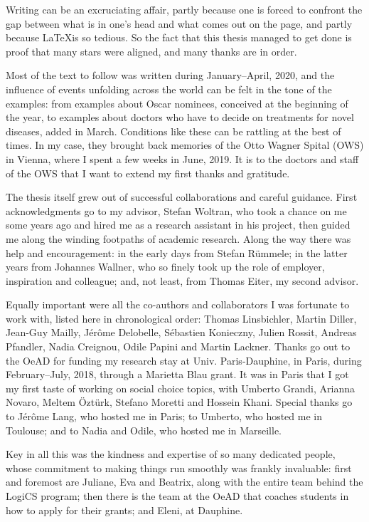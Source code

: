 Writing can be an excruciating affair, 
partly because one is forced to confront the 
gap between what is in one's head and what comes out on the page,
and partly because \LaTeX is so tedious.
So the fact that this thesis managed to get done is proof 
that many stars were aligned, and many thanks are in order.

Most of the text to follow was written during January--April, 2020,
and the influence of events unfolding across the world 
can be felt in the tone of the examples: 
from examples about Oscar nominees, conceived at the beginning of the year,
to examples about doctors who have to decide on treatments for novel diseases, added in March.
Conditions like these can be rattling at the best of times.
In my case, they brought back memories of the Otto Wagner Spital (OWS) in Vienna, 
where I spent a few weeks in June, 2019. It is to the doctors and staff of the OWS
that I want to extend my first thanks and gratitude.

The thesis itself grew out of successful collaborations and careful guidance.
First acknowledgments go to my advisor, Stefan Woltran, who took a chance 
on me some years ago and hired me as a research assistant in his project, 
then guided me along the winding footpaths of academic research.
Along the way there was help and encouragement: in the early days from Stefan R\"ummele;
in the latter years from Johannes Wallner, who so finely took up the role of 
employer, inspiration and colleague; and, not least, from Thomas Eiter, 
my second advisor.

Equally important were all the co-authors and collaborators I was fortunate to work with,
listed here in chronological order:
Thomas Linsbichler, Martin Diller, Jean-Guy Mailly, J\'er\^ome Delobelle, S\'ebastien Konieczny,
Julien Rossit, Andreas Pfandler, Nadia Creignou, Odile Papini and Martin Lackner.  
Thanks go out to the OeAD for funding my research stay at Univ. Paris-Dauphine,
in Paris, during February--July, 2018, through a Marietta Blau grant. 
It was in Paris that I got my first taste of working on social choice topics, 
with Umberto Grandi, Arianna Novaro, Meltem \"Ozt\"urk, Stefano Moretti and Hossein Khani.
Special thanks go to J\'er\^ome Lang, who hosted me in Paris; 
to Umberto, who hosted me in Toulouse; 
and to Nadia and Odile, who hosted me in Marseille.

Key in all this was the kindness and expertise of so many dedicated people,
whose commitment to making things run smoothly was frankly invaluable:
first and foremost are Juliane, Eva and Beatrix, along with the entire 
team behind the LogiCS program; then there is the team at the OeAD 
that coaches students in how to apply for their grants; and Eleni, at Dauphine.

